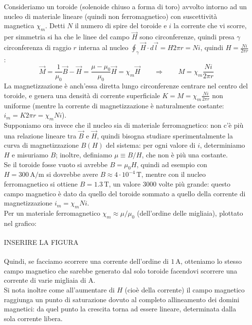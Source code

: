 \documentclass[]{article}
\begin{document}
Consideriamo un toroide (solenoide chiuso a forma di toro) avvolto intorno ad un nucleo di materiale lineare (quindi non ferromagnetico) con suscettività magnetica $ \chi_m $. Detti $ N $ il numero di spire del toroide e $ i $ la corrente che vi scorre, per simmetria si ha che le linee del campo $ \vec{H} $ sono circonferenze, quindi presa $ \gamma $ circonferenza di raggio $ r $ interna al nucleo $ \oint_{\gamma} \vec{H} \cdot d\vec{l} = H 2\pi r = N i $, quindi $ H = \frac{N i}{2\pi r} $:
\begin{equation}
	\vec{M} = \frac{1}{\mu_0} \vec{B} - \vec{H} = \frac{\mu - \mu_0}{\mu_0} \vec{H} = \chi_m \vec{H} \qquad\Longrightarrow\qquad M = \chi_m \frac{Ni}{2\pi r}
	\label{eq:28}
\end{equation}
La magnetizzazione è anch'essa diretta lungo circonferenze centrare nel centro del toroide, e genera una densità di corrente superficiale $ K = M = \chi_m \frac{N i}{2\pi r} $ non uniforme (mentre la corrente di magnetizzazione è naturalmente costante: $ i_m = K 2\pi r = \chi_m N i $). \\ 
%
Supponiamo ora invece che il nucleo sia di materiale ferromagnetico: non c'è più una relazione lineare tra $ \vec{B} $ e $ \vec{H} $, quindi bisogna studiare sperimentalmente la curva di magnetizzazione $ B(H) $ del sistema: per ogni valore di $ i $, determiniamo $ H $ e misuriamo $ B $; inoltre, definiamo $ \mu \equiv B / H $, che non è più una costante. \\ 
%
Se il toroide fosse vuoto si avrebbe $ B = \mu_0 H $, quindi ad esempio con $ H = 300 \,\text{A/m} $ si dovrebbe avere $ B \approx 4 \cdot 10^{-4} \,\text{T} $, mentre con il nucleo ferromagnetico si ottiene $ B = 1.3 \,\text{T} $, un valore $ 3000 $ volte più grande: questo campo magnetico è dato da quello del toroide sommato a quello della corrente di magnetizzazione $ i_m = \chi_m N i $. \\ 
%
Per un materiale ferromagnetico $ \chi_m \approx \mu / \mu_0 $ (dell'ordine delle migliaia), plottato nel grafico: \\ 
%
%
%
\hbox{}\\ INSERIRE LA FIGURA\\ \hbox{}\\ 
%
%
%
Quindi, se facciamo scorrere una corrente dell'ordine di $ 1\,\text{A} $, otteniamo lo stesso campo magnetico che sarebbe generato dal solo toroide facendovi scorrere una corrente di varie migliaia di $ \text{A} $. \\ 
Si nota inoltre come all'aumentare di $ H $ (cioè della corrente) il campo magnetico raggiunga un punto di saturazione dovuto al completo allineamento dei domini magnetici: da quel punto la crescita torna ad essere lineare, determinata dalla sola corrente libera. \\ 
\end{document}

